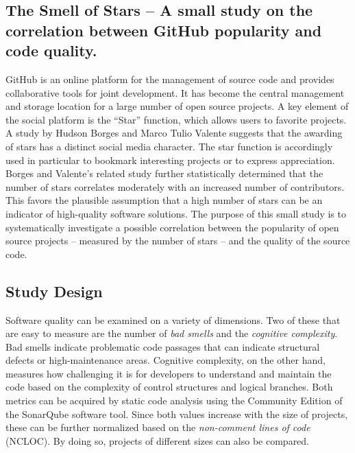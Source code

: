 \documentclass[a4paper, 12pt]{article}
\begin{document}
	
\subsection*{The Smell of Stars -- A small study on the correlation between GitHub popularity and code quality.}

GitHub is an online platform for the management of source code and provides collaborative tools for joint development. It has become the central management and storage location for a large number of open source projects. A key element of the social platform is the “Star” function, which allows users to favorite projects.\\

A study by Hudson Borges and Marco Tulio Valente\autocite{Borges2018} suggests that the awarding of stars has a distinct social media character. The star function is accordingly used in particular to bookmark interesting projects or to express appreciation. Borges and Valente's related study further statistically determined that the number of stars correlates moderately with an increased number of contributors.\\

This favors the plausible assumption that a high number of stars can be an indicator of high-quality software solutions. The purpose of this small study is to systematically investigate a possible correlation between the popularity of open source projects -- measured by the number of stars -- and the quality of the source code.\\
	
\subsection*{Study Design}

Software quality can be examined on a variety of dimensions. Two of these that are easy to measure are the number of \textit{bad smells} and the \textit{cognitive complexity}\autocite{Bogner2022}. Bad smells indicate problematic code passages that can indicate structural defects or high-maintenance areas. Cognitive complexity, on the other hand, measures how challenging it is for developers to understand and maintain the code based on the complexity of control structures and logical branches. Both metrics can be acquired by static code analysis using the Community Edition of the SonarQube software tool\autocite{SonarQube}. Since both values increase with the size of projects, these can be further normalized based on the \textit{non-comment lines of code} (NCLOC). By doing so, projects of different sizes can also be compared.\\
\end{document}
